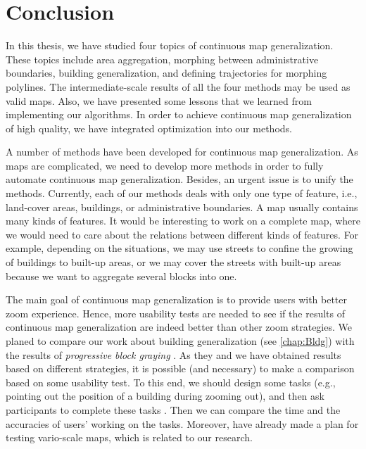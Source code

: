 \chapter{Conclusion}
\label{chap:Conclusion}

In this thesis, we have studied four topics of 
continuous map generalization.
These topics include area aggregation, 
morphing between administrative boundaries,
building generalization, and
defining trajectories for morphing polylines.
The intermediate-scale results of all the four methods
may be used as valid maps.
Also, we have presented some lessons that 
we learned from implementing our algorithms.
In order to achieve continuous map generalization 
of high quality, 
we have integrated optimization into our methods.

A number of methods have been developed for
continuous map generalization.
As maps are complicated,
we need to develop more methods 
in order to fully automate continuous map generalization.
Besides, an urgent issue is to unify the methods.
Currently, each of our methods deals with 
only one type of feature, i.e., 
land-cover areas, buildings, or administrative boundaries.
A map usually contains many kinds of features.
It would be interesting to work on a complete map,
where we would need to care about the relations 
between different kinds of features.
For example, depending on the situations, 
we may use streets to confine the growing of 
buildings to built-up areas, 
or we may cover the streets with built-up areas 
because we want to aggregate several blocks into one.

The main goal of continuous map generalization is to provide 
users with better zoom experience.
Hence, more usability tests are needed to see 
if the results of continuous map generalization 
are indeed better than other zoom strategies.
We planed to compare our work about building generalization 
(see \chap\ref{chap:Bldg}) 
with the results of \emph{progressive block graying} 
\parencite[see][]{Touya2017Progressive}.
As they and we have obtained results 
based on different strategies, 
it is possible (and necessary) to make a comparison 
based on some usability test.
To this end, we should design some tasks 
(e.g., pointing out the 
position of a building during zooming out), 
and then ask participants to complete these tasks
\parencite[e.g.,][]{Midtbo2007}.
Then we can compare the time and the accuracies
of users' working on the tasks.
Moreover, \textcite{Suba2016Usability} 
have already made a plan for 
testing vario-scale maps, which is related to our research.


